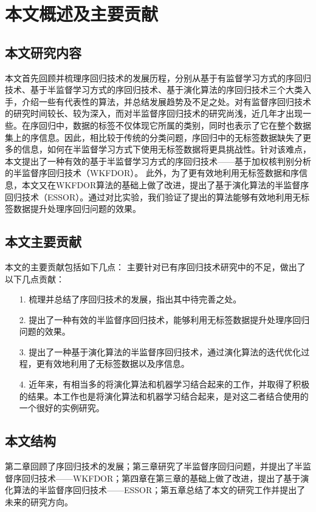 \section{本文概述及主要贡献}
\subsection{本文研究内容}
本文首先回顾并梳理序回归技术的发展历程，分别从基于有监督学习方式的序回归技术、基于半监督学习方式的序回归技术、基于演化算法的序回归技术三个大类入手，介绍一些有代表性的算法，并总结发展趋势及不足之处。对有监督序回归技术的研究时间较长、较为深入，而对半监督序回归技术的研究尚浅，近几年才出现一些。在序回归中，数据的标签不仅体现它所属的类别，同时也表示了它在整个数据集上的序信息。因此，相比较于传统的分类问题，序回归中的无标签数据缺失了更多的信息，如何在半监督学习方式下使用无标签数据将更具挑战性。针对该难点，本文提出了一种有效的基于半监督学习方式的序回归技术——基于加权核判别分析的半监督序回归技术（WKFDOR\citep{wu2015evolutionary}）。
此外，为了更有效地利用无标签数据和序信息，本文又在WKFDOR算法的基础上做了改进，提出了基于演化算法的半监督序回归技术（ESSOR\citep{wu2015evolutionary}）。通过对比实验，我们验证了提出的算法能够有效地利用无标签数据提升处理序回归问题的效果。

\subsection{本文主要贡献}
本文的主要贡献包括如下几点：
主要针对已有序回归技术研究中的不足，做出了以下几点贡献：
\begin{enumerate}
\item[1.]梳理并总结了序回归技术的发展，指出其中待完善之处。
\item[2.]提出了一种有效的半监督序回归技术，能够利用无标签数据提升处理序回归问题的效果。
\item[3.]提出了一种基于演化算法的半监督序回归技术，通过演化算法的迭代优化过程，更有效地利用了无标签数据以及序信息。
\item[4.]近年来，有相当多的将演化算法和机器学习结合起来的工作，并取得了积极的结果。本工作也是将演化算法和机器学习结合起来，是对这二者结合使用的一个很好的实例研究。
\end{enumerate}

\subsection{本文结构}
第二章回顾了序回归技术的发展；第三章研究了半监督序回归问题，并提出了半监督序回归技术——WKFDOR；第四章在第三章的基础上做了改进，提出了基于演化算法的半监督序回归技术——ESSOR；第五章总结了本文的研究工作并提出了未来的研究方向。
